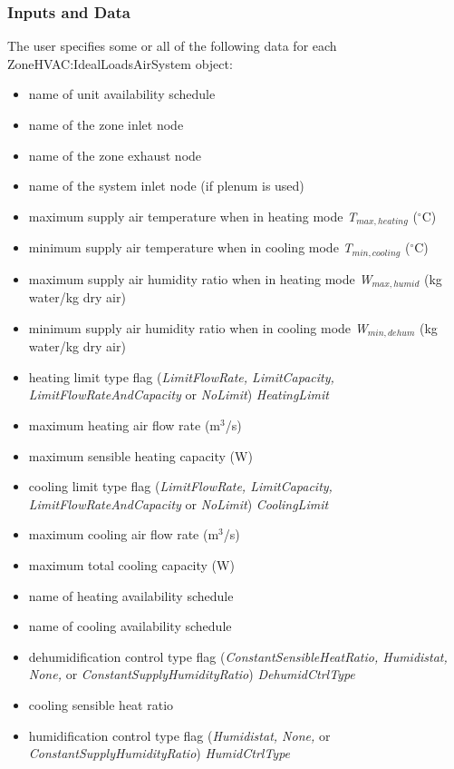 \subsubsection{Inputs and Data}\label{inputs-and-data-002}

The user specifies some or all of the following data for each ZoneHVAC:IdealLoadsAirSystem object:

\begin{itemize}
  \item name of unit availability schedule
  \item name of the zone inlet node
  \item name of the zone exhaust node
  \item name of the system inlet node (if plenum is used)
  \item maximum supply air temperature when in heating mode \emph{T\(_{max,heating}\)} (\(^{\circ}\)C)
  \item minimum supply air temperature when in cooling mode \emph{T\(_{min,cooling}\)} (\(^{\circ}\)C)
  \item maximum supply air humidity ratio when in heating mode \emph{W\(_{max,humid}\)} (kg water/kg dry air)
  \item minimum supply air humidity ratio when in cooling mode \emph{W\(_{min,dehum}\)} (kg water/kg dry air)
  \item heating limit type flag (\emph{LimitFlowRate, LimitCapacity, LimitFlowRateAndCapacity} or \emph{NoLimit}) \emph{HeatingLimit}
  \item maximum heating air flow rate (m\(^{3}\)/s)
  \item maximum sensible heating capacity (W)
  \item cooling limit type flag (\emph{LimitFlowRate, LimitCapacity, LimitFlowRateAndCapacity} or \emph{NoLimit}) \emph{CoolingLimit}
  \item maximum cooling air flow rate (m\(^{3}\)/s)
  \item maximum total cooling capacity (W)
  \item name of heating availability schedule
  \item name of cooling availability schedule
  \item dehumidification control type flag (\emph{ConstantSensibleHeatRatio, Humidistat, None,} or \emph{ConstantSupplyHumidityRatio}) \emph{DehumidCtrlType}
  \item cooling sensible heat ratio
  \item humidification control type flag (\emph{Humidistat, None,} or \emph{ConstantSupplyHumidityRatio}) \emph{HumidCtrlType}

\end{itemize}
